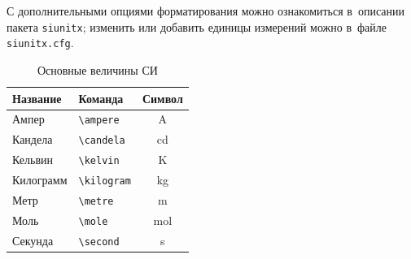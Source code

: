 С дополнительными опциями форматирования можно ознакомиться в~описании пакета \texttt{siunitx};
изменить или добавить единицы измерений можно в~файле \texttt{siunitx.cfg}.

\begin{table}
    \centering
    \captionsetup{justification=centering} %
    \caption{Основные величины СИ}\label{tab:unit:base}
    \begin{tabular}{llc}
        \toprule
        Название  & Команда                 & Символ         \\
        \midrule
        Ампер     & \verb|\ampere| & \si{\ampere}   \\
        Кандела   & \verb|\candela| & \si{\candela}  \\
        Кельвин   & \verb|\kelvin| & \si{\kelvin}   \\
        Килограмм & \verb|\kilogram| & \si{\kilogram} \\
        Метр      & \verb|\metre| & \si{\metre}    \\
        Моль      & \verb|\mole| & \si{\mole}     \\
        Секунда   & \verb|\second| & \si{\second}   \\
        \bottomrule
    \end{tabular}
\end{table}

